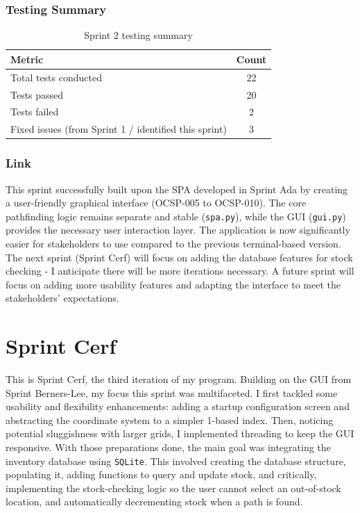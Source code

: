 \subsubsection{Testing Summary}
\begin{table}[htbp]
	\centering
	\begin{tabular}{|l|c|}
		\hline
		\textbf{Metric} & \textbf{Count} \\
		\hline
		Total tests conducted & 22 \\ %
		\hline
		Tests passed & 20 \\ %
		\hline
		Tests failed & 2 \\ %
		\hline
		Fixed issues (from Sprint 1 / identified this sprint) & 3 \\ %
		\hline
	\end{tabular}
	\caption{Sprint 2 testing summary}
\end{table}


\subsubsection{Link}
This sprint successfully built upon the SPA developed in Sprint Ada by creating a user-friendly graphical interface (OCSP-005 to OCSP-010). The core pathfinding logic remains separate and stable (\verb|spa.py|), while the GUI (\verb|gui.py|) provides the necessary user interaction layer. The application is now significantly easier for stakeholders to use compared to the previous terminal-based version. The next sprint (Sprint Cerf) will focus on adding the database features for stock checking - I anticipate there will be more iterations necessary. A future sprint will focus on adding more usability features and adapting the interface to meet the stakeholders' expectations.

\newpage

\section{Sprint Cerf}

This is Sprint Cerf, the third iteration of my program. Building on the GUI from Sprint Berners-Lee, my focus this sprint was multifaceted. I first tackled some usability and flexibility enhancements: adding a startup configuration screen and abstracting the coordinate system to a simpler 1-based index. Then, noticing potential sluggishness with larger grids, I implemented threading to keep the GUI responsive. With those preparations done, the main goal was integrating the inventory database using \verb|SQLite|. This involved creating the database structure, populating it, adding functions to query and update stock, and critically, implementing the stock-checking logic so the user cannot select an out-of-stock location, and automatically decrementing stock when a path is found.

